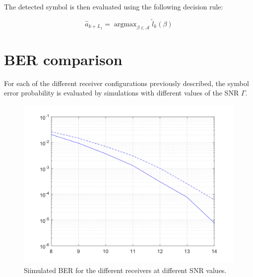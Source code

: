 \documentclass[a4paper, 12pt]{report}
\DeclareMathOperator*{\argmax}{argmax}
\begin{document}
The detected symbol is then evaluated using the following decision rule:

\begin{equation}
\hat{a}_{k+L_1} = \argmax_{\beta \in \mathcal{A}} \tilde{l}_k(\beta)
\end{equation}

\clearpage
\section*{BER comparison}
For each of the different receiver configurations previously described, the symbol error probability is evaluated by simulations with different values of the SNR $\Gamma$. 

\begin{figure}[H]
	\centering
	\includegraphics[width=12cm]{images/PevsGamma}
	\caption{Siimulated BER for the different receivers at different SNR values.}\label{Pe}
\end{figure}
\end{document}
